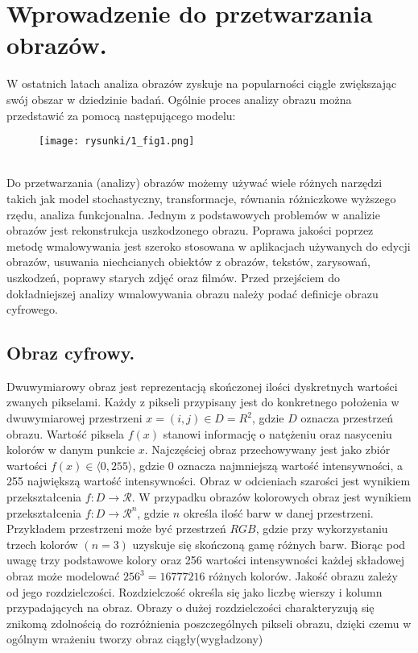 \documentclass[12pt, twoside, openany]{report}
\theoremstyle{definition}
\begin{document}
\newpage
\printunsrtglossary[type=symbols, style=long, title={Wykaz oznaczeń i symboli}]
    

\chapter{Wprowadzenie do przetwarzania obrazów.}
W ostatnich latach analiza obrazów zyskuje na popularności ciągle zwiększając swój obszar w dziedzinie badań. Ogólnie proces analizy obrazu można przedstawić za pomocą następującego modelu: \\
\begin{figure}[!h]
	\centering
	\texttt{[image: rysunki/1\_fig1.png]}
\end{figure}
\\
Do przetwarzania (analizy) obrazów możemy używać wiele różnych narzędzi takich jak model stochastyczny, transformacje, równania różniczkowe wyższego rzędu, analiza funkcjonalna. Jednym z podstawowych problemów w analizie obrazów jest rekonstrukcja uszkodzonego obrazu. Poprawa jakości poprzez metodę wmalowywania jest szeroko stosowana w aplikacjach używanych do edycji obrazów, usuwania niechcianych obiektów z obrazów, tekstów, zarysowań, uszkodzeń, poprawy starych zdjęć oraz filmów. Przed przejściem do dokładniejszej analizy wmalowywania obrazu należy podać definicje obrazu cyfrowego.
\section{Obraz cyfrowy.}
Dwuwymiarowy obraz jest reprezentacją skończonej ilości dyskretnych wartości zwanych pikselami. Każdy z pikseli przypisany jest do konkretnego położenia w dwuwymiarowej przestrzeni $x = (i,j) \in D=R^2$, gdzie $D$ oznacza przestrzeń obrazu. Wartość piksela $f(x)$ stanowi informację o natężeniu oraz nasyceniu kolorów w danym punkcie $x$. Najczęściej obraz przechowywany jest jako zbiór wartości $f(x) \in \langle 0,255 \rangle$, gdzie 0 oznacza najmniejszą wartość intensywności, a 255 największą wartość intensywności. Obraz w odcieniach szarości jest wynikiem przekształcenia $f: D \rightarrow \mathcal{R}$. W przypadku obrazów kolorowych obraz jest wynikiem przekształcenia $f: D \rightarrow \mathcal{R}^n$, gdzie $n$ określa ilość barw w danej przestrzeni. Przykładem przestrzeni może być przestrzeń $RGB$, gdzie przy wykorzystaniu trzech kolorów $(n=3)$ uzyskuje się skończoną gamę różnych barw. Biorąc pod uwagę trzy podstawowe kolory oraz 256 wartości intensywności każdej składowej obraz może modelować $256^3=16777216$ różnych kolorów. Jakość obrazu zależy od jego rozdzielczości. Rozdzielczość określa się jako liczbę wierszy i kolumn przypadających na obraz. Obrazy o dużej rozdzielczości charakteryzują się znikomą zdolnością do rozróżnienia poszczególnych pikseli obrazu, dzięki czemu w ogólnym wrażeniu tworzy obraz ciągły(wygładzony)
\end{document}
